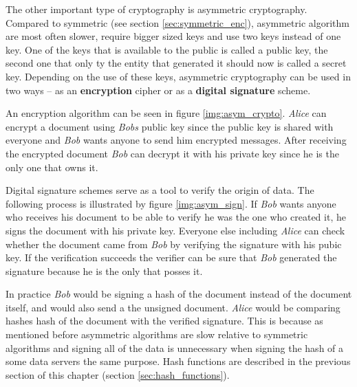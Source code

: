 The other important type of cryptography is asymmetric cryptography. Compared to symmetric (see section \ref{sec:symmetric_enc}), asymmetric algorithm are most often slower, require bigger sized keys and use two keys instead of one key. One of the keys that is available to the public is called a public key, the second one that only ty the entity that generated it should now is called a secret key. Depending on the use of these keys, asymmetric cryptography can be used in two ways -- as an \textbf{encryption} cipher or as a \textbf{digital signature} scheme.

An encryption algorithm can be seen in figure \ref{img:asym_crypto}. \textit{Alice} can encrypt a document using \textit{Bobs} public key since the public key is shared with everyone and \textit{Bob} wants anyone to send him encrypted messages. After receiving the encrypted document \textit{Bob} can decrypt it with his private key since he is the only one that owns it. \cite{Smart2004}


Digital signature schemes serve as a tool to verify the origin of data. The following process is illustrated by figure \ref{img:asym_sign}. If \textit{Bob} wants anyone who receives his document to be able to verify he was the one who created it, he signs the document with his private key. Everyone else including \textit{Alice} can check whether the document came from \textit{Bob} by verifying the signature with his pubic key. If the verification succeeds the verifier can be sure that \textit{Bob} generated the signature because he is the only that posses it. \cite{Paar2010}

In practice \textit{Bob} would be signing a hash of the document instead of the document itself, and would also send a the unsigned document. \textit{Alice} would be comparing hashes hash of the document with the verified signature. This is because as mentioned before asymmetric algorithms are slow relative to symmetric algorithms and signing all of the data is unnecessary when signing the hash of a some data servers the same purpose. Hash functions are described in the previous section of this chapter (section \ref{sec:hash_functions}).

